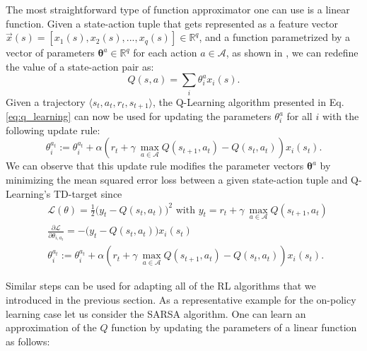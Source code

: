 The most straightforward type of function approximator one can use is a linear function. Given a state-action tuple that gets represented as a feature vector $\vec{x}(s)=[x_1(s), x_2(s), ..., x_q(s)] \in \mathds{R}^q$, and a function parametrized by a vector of parameters $\mathbold{\theta}^a\in\mathds{R}^q$ for each action $a\in\mathcal{A}$, as shown in \cite{wiering2004convergence}, we can redefine the value of a state-action pair as:
\begin{equation}
	Q(s,a) = \sum_i \theta^a_{i} x_i(s).
\end{equation}
Given a trajectory $\langle s_t,a_t,r_t,s_{t+1}\rangle$, the Q-Learning algorithm presented in Eq. \ref{eq:q_learning} can now be used for updating the parameters $\theta^a_i$ for all $i$ with the following update rule:
\begin{equation}
	\theta^{a_t}_{i} := \theta^{a_t}_{i} + \alpha(r_t +\gamma\:\underset{a\in \mathcal{A}}{\max} Q(s_{t+1},a_t) - Q(s_t, a_t)) x_i(s_t).
	\label{eq:q_learning_fa}
\end{equation}
We can observe that this update rule modifies the parameter vectors $\mathbold{\theta}^a$ by minimizing the mean squared error loss between a given state-action tuple and Q-Learning's TD-target since  
\begin{equation}
\begin{split}
	& \mathcal{L}(\theta) = \frac{1}{2}\big(y_t - Q(s_t, a_t)\big)^2 \mbox{ with } y_t = r_t +\gamma\:\underset{a\in \mathcal{A}}{\max} Q(s_{t+1},a_t) \\ 
	& \frac{\partial\mathcal{L}}{\partial \theta_{i,a_t}}=-\big(y_t - Q(s_t, a_t)\big) x_i(s_t)  \\ 
 	& \theta^{a_t}_{i} := \theta^{a_t}_{i} + \alpha(r_t +\gamma\:\underset{a\in \mathcal{A}}{\max} Q(s_{t+1},a_t) - Q(s_t, a_t)) x_i(s_t).
\end{split}
\end{equation}

Similar steps can be used for adapting all of the RL algorithms that we introduced in the previous section. As a representative example for the on-policy learning case let us consider the SARSA algorithm. One can learn an approximation of the $Q$ function by updating the parameters of a linear function as follows:

